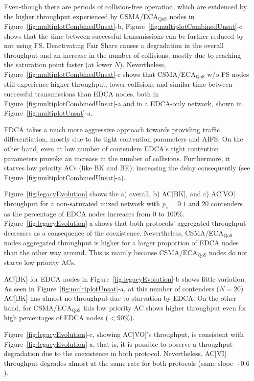 Even-though there are periods of collision-free operation, which are evidenced by the higher throughput experienced by CSMA/ECA$_{\text{QoS}}$ nodes in Figure~\ref{fig:multiplotCombinedUnsat}-b, Figure~\ref{fig:multiplotCombinedUnsat}-c shows that the time between successful transmissions can be further reduced by not using FS. Deactivating Fair Share causes a degradation in the overall throughput and an increase in the number of collisions, mostly due to reaching the saturation point faster (at lower $N$). Nevertheless, Figure~\ref{fig:multiplotCombinedUnsat}-c shows that CSMA/ECA$_{\text{QoS}}$ w/o FS nodes still experience higher throughput, lower collisions and similar time between successful transmissions than EDCA nodes, both in Figure~\ref{fig:multiplotCombinedUnsat}-a and in a EDCA-only network, shown in Figure~\ref{fig:multiplotUnsat}-a.



EDCA takes a much more aggressive approach towards providing traffic differentiation, mostly due to its tight contention parameters and AIFS. On the other hand, even at low number of contenders EDCA's tight contention parameters provoke an increase in the number of collisions. Furthermore, it starves low priority ACs (like BK and BE); increasing the delay consequently (see Figure~\ref{fig:multiplotCombinedUnsat}-a).

Figure~\ref{fig:legacyEvolution} shows the a) overall, b) AC[BK], and c) AC[VO] throughput for a non-saturated mixed network with $p_e=0.1$ and 20 contenders as the percentage of EDCA nodes increases from 0 to 100\%. Figure~\ref{fig:legacyEvolution}-a shows that both protocols' aggregated throughput decreases as a consequence of the coexistence. Nevertheless, CSMA/ECA$_{\text{QoS}}$ nodes aggregated throughput is higher for a larger proportion of EDCA nodes than the other way around. This is mainly because CSMA/ECA$_{\text{QoS}}$ nodes do not starve low priority ACs.

AC[BK] for EDCA nodes in Figure~\ref{fig:legacyEvolution}-b shows little variation. As seen in Figure~\ref{fig:multiplotUnsat}-a, at this number of contenders ($N=20$) AC[BK] has almost no throughput due to starvation by EDCA. On the other hand, for CSMA/ECA$_{\text{QoS}}$ this low priority AC shows higher throughput even for high percentages of EDCA nodes ($<90\%$).

Figure~\ref{fig:legacyEvolution}-c, showing AC[VO]'s throughput, is consistent with Figure~\ref{fig:legacyEvolution}-a, that is, it is possible to observe a throughput degradation due to the coexistence in both protocol. Nevertheless, AC[VI] throughput degrades almost at the same rate for both protocols (same slope $\pm 0.6$).

